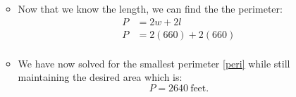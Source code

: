 \documentclass[12pt]{article}
\begin{document}
\begin{enumerate}
\begin{itemize}
\begin{equation}
      \end{equation}
      \item Now that we know the length, we can find the the perimeter:
      \begin{equation}
        \begin{split}
          P &= 2w + 2l\\
          P &= 2(660) + 2(660)\\
        \end{split}
        \tag {Solving Perimeter} \label{peri}
      \end{equation}
      \item We have now solved for the smallest perimeter \eqref{peri} while still maintaining the desired area which is:
      \begin{equation}
        P = 2640\ \text{feet}. \tag{Perimeter}
      \end{equation}
    \end{itemize}
  \end{enumerate}
\end{document}
